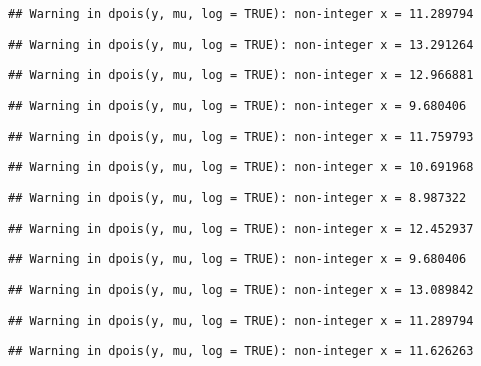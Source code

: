 \documentclass[
]{article}
\begin{document}
\begin{verbatim}
## Warning in dpois(y, mu, log = TRUE): non-integer x = 11.289794
\end{verbatim}

\begin{verbatim}
## Warning in dpois(y, mu, log = TRUE): non-integer x = 13.291264
\end{verbatim}

\begin{verbatim}
## Warning in dpois(y, mu, log = TRUE): non-integer x = 12.966881
\end{verbatim}

\begin{verbatim}
## Warning in dpois(y, mu, log = TRUE): non-integer x = 9.680406
\end{verbatim}

\begin{verbatim}
## Warning in dpois(y, mu, log = TRUE): non-integer x = 11.759793
\end{verbatim}

\begin{verbatim}
## Warning in dpois(y, mu, log = TRUE): non-integer x = 10.691968
\end{verbatim}

\begin{verbatim}
## Warning in dpois(y, mu, log = TRUE): non-integer x = 8.987322
\end{verbatim}

\begin{verbatim}
## Warning in dpois(y, mu, log = TRUE): non-integer x = 12.452937
\end{verbatim}

\begin{verbatim}
## Warning in dpois(y, mu, log = TRUE): non-integer x = 9.680406
\end{verbatim}

\begin{verbatim}
## Warning in dpois(y, mu, log = TRUE): non-integer x = 13.089842
\end{verbatim}

\begin{verbatim}
## Warning in dpois(y, mu, log = TRUE): non-integer x = 11.289794
\end{verbatim}

\begin{verbatim}
## Warning in dpois(y, mu, log = TRUE): non-integer x = 11.626263
\end{verbatim}
\end{document}
